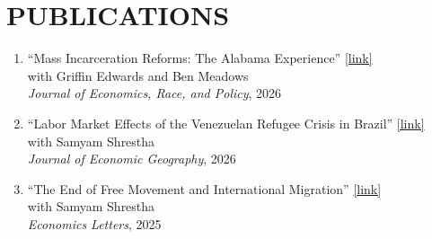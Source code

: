 \documentclass[11pt,letterpaper]{article}
\begin{document}
\section*{PUBLICATIONS}
\begin{enumerate}
    \item ``Mass Incarceration Reforms: The Alabama Experience'' \href{https://doi.org/10.1007/s41996-026-00200-1}{[link]} \\
    with Griffin Edwards and Ben Meadows \\
    \textit{Journal of Economics, Race, and Policy}, 2026

    \item ``Labor Market Effects of the Venezuelan Refugee Crisis in Brazil'' \href{https://doi.org/10.1093/jeg/lbaf047}{[link]} \\
    with Samyam Shrestha \\
    \textit{Journal of Economic Geography}, 2026

    \item ``The End of Free Movement and International Migration'' \href{https://doi.org/10.1016/j.econlet.2025.112759}{[link]} \\
    with Samyam Shrestha \\
    \textit{Economics Letters}, 2025
\end{enumerate}

\end{document}
